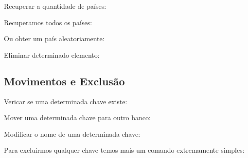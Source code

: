 Recuperar a quantidade de países: \\

Recuperamos todos os países: \\

Ou obter um país aleatoriamente: \\

Eliminar determinado elemento: \\

\subsection{Movimentos e Exclusão}
Vericar se uma determinada chave existe: \\

Mover uma determinada chave para outro banco: \\

Modificar o nome de uma determinada chave: \\

Para excluirmos qualquer chave temos mais um comando extremamente simples: \\

